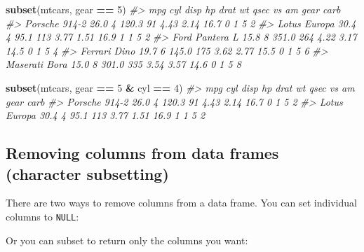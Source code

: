 \documentclass[]{book}
\newenvironment{Shaded}{\begin{snugshade}}{\end{snugshade}}
\newcommand{\CommentTok}[1]{\textcolor[rgb]{0.56,0.35,0.01}{\textit{#1}}}
\newcommand{\DataTypeTok}[1]{\textcolor[rgb]{0.13,0.29,0.53}{#1}}
\newcommand{\DecValTok}[1]{\textcolor[rgb]{0.00,0.00,0.81}{#1}}
\newcommand{\KeywordTok}[1]{\textcolor[rgb]{0.13,0.29,0.53}{\textbf{#1}}}
\newcommand{\NormalTok}[1]{#1}
\newcommand{\OperatorTok}[1]{\textcolor[rgb]{0.81,0.36,0.00}{\textbf{#1}}}
\newcommand{\OtherTok}[1]{\textcolor[rgb]{0.56,0.35,0.01}{#1}}
\newcommand{\StringTok}[1]{\textcolor[rgb]{0.31,0.60,0.02}{#1}}
\theoremstyle{definition}
\theoremstyle{definition}
\theoremstyle{definition}
\theoremstyle{remark}
\begin{document}
\begin{Shaded}
\begin{Highlighting}[]
\KeywordTok{subset}\NormalTok{(mtcars, gear }\OperatorTok{==}\StringTok{ }\DecValTok{5}\NormalTok{)}
\CommentTok{#>                 mpg cyl  disp  hp drat   wt qsec vs am gear carb}
\CommentTok{#> Porsche 914-2  26.0   4 120.3  91 4.43 2.14 16.7  0  1    5    2}
\CommentTok{#> Lotus Europa   30.4   4  95.1 113 3.77 1.51 16.9  1  1    5    2}
\CommentTok{#> Ford Pantera L 15.8   8 351.0 264 4.22 3.17 14.5  0  1    5    4}
\CommentTok{#> Ferrari Dino   19.7   6 145.0 175 3.62 2.77 15.5  0  1    5    6}
\CommentTok{#> Maserati Bora  15.0   8 301.0 335 3.54 3.57 14.6  0  1    5    8}

\KeywordTok{subset}\NormalTok{(mtcars, gear }\OperatorTok{==}\StringTok{ }\DecValTok{5} \OperatorTok{&}\StringTok{ }\NormalTok{cyl }\OperatorTok{==}\StringTok{ }\DecValTok{4}\NormalTok{)}
\CommentTok{#>                mpg cyl  disp  hp drat   wt qsec vs am gear carb}
\CommentTok{#> Porsche 914-2 26.0   4 120.3  91 4.43 2.14 16.7  0  1    5    2}
\CommentTok{#> Lotus Europa  30.4   4  95.1 113 3.77 1.51 16.9  1  1    5    2}
\end{Highlighting}
\end{Shaded}

\hypertarget{removing-columns-from-data-frames-character-subsetting}{%
\subsection{Removing columns from data frames (character
subsetting)}\label{removing-columns-from-data-frames-character-subsetting}}

There are two ways to remove columns from a data frame. You can set
individual columns to \texttt{NULL}:

\begin{Shaded}
\end{Shaded}

Or you can subset to return only the columns you want:
\end{document}
